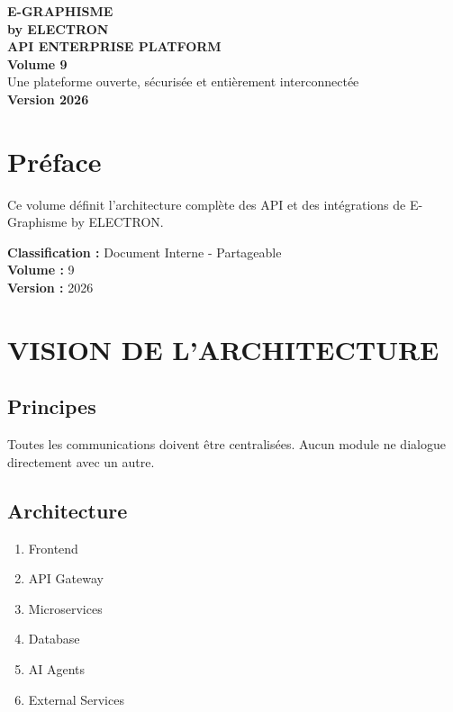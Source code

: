 \documentclass[12pt,a4paper,oneside]{book}
\begin{document}
\begin{titlepage}
\thispagestyle{empty}
\begin{center}
\vspace*{2cm}
{\Huge\bfseries\color{bleuIA}E-GRAPHISME}\\[0.3cm]
{\LARGE\bfseries\color{violet}by ELECTRON}\\[2cm]
\vspace{2cm}
{\huge\bfseries\color{noir}API ENTERPRISE PLATFORM}\\[1cm]
{\Large\bfseries\color{cyan}Volume 9}\\[3cm]
\vspace{2cm}
{\Large\color{gris}Une plateforme ouverte, sécurisée et entièrement interconnectée}\\[3cm]
{\Large\bfseries\color{or}Version 2026}\\[2cm]
\vfill
\end{center}
\end{titlepage}

\frontmatter

\chapter*{Préface}
Ce volume définit l'architecture complète des API et des intégrations de E-Graphisme by ELECTRON.

\bigskip
\textbf{Classification :} Document Interne - Partageable\\
\textbf{Volume :} 9\\
\textbf{Version :} 2026

\tableofcontents

\mainmatter

\chapter{VISION DE L'ARCHITECTURE}

\section{Principes}
Toutes les communications doivent être centralisées. Aucun module ne dialogue directement avec un autre.

\section{Architecture}
\begin{enumerate}
\item Frontend
\item API Gateway
\item Microservices
\item Database
\item AI Agents
\item External Services
\end{enumerate}
\end{document}
